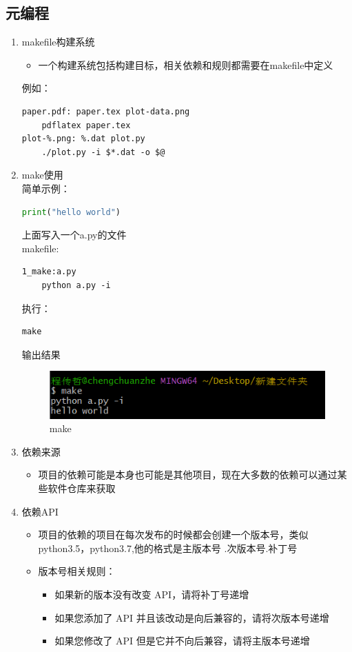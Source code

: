 \documentclass[a4paper, 12pt]{article}
\begin{document}
\subsection{元编程}
\begin{enumerate}
  \item{\large makefile构建系统}
    \begin{itemize}
        \item 一个构建系统包括构建目标，相关依赖和规则都需要在makefile中定义
    \end{itemize}
    例如：
    \begin{lstlisting}
paper.pdf: paper.tex plot-data.png
	pdflatex paper.tex
plot-%.png: %.dat plot.py
	./plot.py -i $*.dat -o $@
    \end{lstlisting}
  \item{\large make使用}
    \\简单示例：
    \begin{lstlisting}[language = python]
print("hello world")
    \end{lstlisting}
    上面写入一个a.py的文件 \\
    makefile:
    \begin{lstlisting}
1_make:a.py
    python a.py -i
    \end{lstlisting}
    执行：
    \begin{lstlisting}
make
    \end{lstlisting}    
    输出结果
    \begin{figure}[htbp]
      \centering
      \includegraphics[scale=1]{3.png}
      \caption{make}
      \label{figure}
    \end{figure}
  \item{\large 依赖来源}
    \begin{itemize}
        \item 项目的依赖可能是本身也可能是其他项目，现在大多数的依赖可以通过某些软件仓库来获取
    \end{itemize}
  \item{\large 依赖API}
    \begin{itemize}
        \item 项目的依赖的项目在每次发布的时候都会创建一个版本号，类似python3.5，python3.7,他的格式是主版本号
            .次版本号.补丁号
        \item 版本号相关规则：
            \begin{itemize}
                \item 如果新的版本没有改变 API，请将补丁号递增
                \item 如果您添加了 API 并且该改动是向后兼容的，请将次版本号递增
                \item 如果您修改了 API 但是它并不向后兼容，请将主版本号递增
            \end{itemize}
    \end{itemize}
\end{enumerate}
\end{document}
